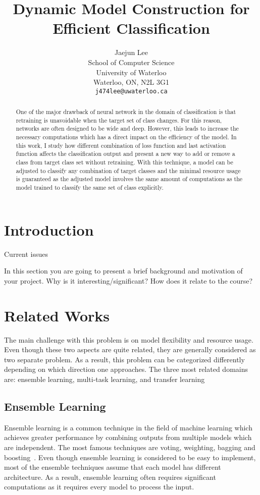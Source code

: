 \documentclass{article}
\title{Dynamic Model Construction for Efficient Classification}
\author{
	Jaejun Lee \\
	School of Computer Science\\
	University of Waterloo\\
	Waterloo, ON, N2L 3G1 \\
	\texttt{j474lee@uwaterloo.ca} \\
}
\begin{document}
\maketitle

\begin{abstract}

One of the major drawback of neural network in the domain of classification is that retraining is unavoidable when the target set of class changes. For this reason, networks are often designed to be wide and deep. However, this leads to increase the necessary computations which has a direct impact on the efficiency of the model. In this work, I study how different combination of loss function and last activation function affects the classification output and present a new way to add or remove a class from target class set without retraining. With this technique, a model can be adjusted to classify any combination of target classes and the minimal resource usage is guaranteed as the adjusted model involves the same amount of computations as the model trained to classify the same set of class explicitly.

\end{abstract}

\section{Introduction}

Current issues


In this section you are going to present a brief background and motivation of your project. Why is it interesting/significant? How does it relate to the course?

\section{Related Works}

The main challenge with this problem is on model flexibility and resource usage. Even though these two aspects are quite related, they are generally considered as two separate problem. As a result, this problem can be categorized differently depending on which direction one approaches. The three most related domains are: ensemble learning, multi-task learning, and transfer learning

\subsection{Ensemble Learning}
Ensemble learning is a common technique in the field of machine learning which achieves greater performance by combining outputs from multiple models which are independent. The most famous techniques are voting, weighting, bagging and boosting~\cite{dietterich2000ensemble, breiman1996bagging, freund1996experiments}. Even though ensemble learning is considered to be easy to implement, most of the ensemble techniques assume that each model has different architecture. As a result, ensemble learning often requires significant computations as it requires every model to process the input.
\end{document}
